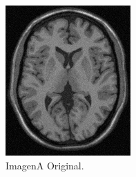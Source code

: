 \documentclass[letterpaper,12pt]{article}
\theoremstyle{plain}
\begin{document}
\begin{figure}[h]
    \centering
         \begin{subfigure}[h]{0.32\linewidth}
            \centering
            \includegraphics[width=\textwidth]{Figuras/ImagenA.png}
            \caption{ImagenA Original.} 
         \end{subfigure}
         \begin{subfigure}[h]{0.32\linewidth}
            \centering

\end{subfigure}
\end{figure}
\end{document}
